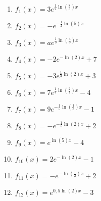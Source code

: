 \begin{Answer}[ref=eFktFGlAA1]\\
	\begin{minipage}{\textwidth}
		\begin{minipage}[t]{0.49\textwidth}
			\begin{enumerate}[label=\alph*)]
				\item \(f_1(x)=3e^{\frac{1}{2}\ln\left(\frac{8}{3}\right)x}\)
				\item \(f_2(x)=-e^{-\frac{1}{2}\ln\left(5\right)x}\)
				\item \(f_3(x)=ae^{\frac{1}{3}\ln\left(\frac{4}{5}\right)x}\)
				\item \(f_4(x)=-2e^{-\ln(2)x}+7\)
				\item \(f_5(x)=-3e^{\frac{1}{3}\ln\left(2\right)x}+3\)
				\item \(f_6(x)=7e^{\frac{1}{4}\ln\left(\frac{2}{7}\right)x}-4\)
			\end{enumerate}
		\end{minipage}
		\begin{minipage}[t]{0.49\textwidth}
			\begin{enumerate}[label=\alph*)]
				\setcounter{enumi}{6}
				\item \(f_7(x)=9e^{-\frac{1}{5}\ln\left(\frac{1}{3}\right)x}-1\)
				\item \(f_8(x)=-e^{-\frac{1}{5}\ln\left(2\right)x}+2\)
				\item \(f_9(x)=e^{\ln(5)x}-4\)
				\item \(f_{10}(x)=2e^{-\ln(2)x}-1\)
				\item \(f_{11}(x)=-e^{-\ln\left(\frac{1}{2}\right)x}+2\)
				\item \(f_{12}(x)=e^{0,5\ln(2)x}-3\)
			\end{enumerate}
		\end{minipage}
	\end{minipage}
\end{Answer}